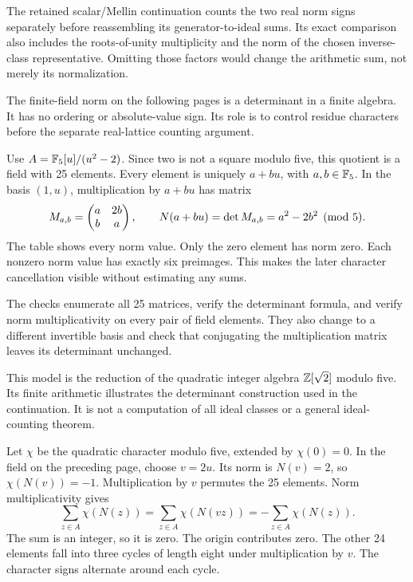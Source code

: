 The retained scalar/Mellin continuation counts the two real norm signs separately before reassembling its generator-to-ideal sums. Its exact comparison also includes the roots-of-unity multiplicity and the norm of the chosen inverse-class representative. Omitting those factors would change the arithmetic sum, not merely its normalization.

The finite-field norm on the following pages is a determinant in a finite algebra. It has no ordering or absolute-value sign. Its role is to control residue characters before the separate real-lattice counting argument.

Use $A=\mathbb F_5[u]/(u^2-2)$. Since two is not a square modulo five, this quotient is a field with 25 elements. Every element is uniquely $a+bu$, with $a,b\in\mathbb F_5$.
In the basis $(1,u)$, multiplication by $a+bu$ has matrix
\[
M_{a,b}=\begin{pmatrix}a&2b\\b&a\end{pmatrix},
\qquad N(a+bu)=\det M_{a,b}=a^2-2b^2\pmod5.
\]
The table shows every norm value. Only the zero element has norm zero. Each nonzero norm value has exactly six preimages. This makes the later character cancellation visible without estimating any sums.

The checks enumerate all 25 matrices, verify the determinant formula, and verify norm multiplicativity on every pair of field elements. They also change to a different invertible basis and check that conjugating the multiplication matrix leaves its determinant unchanged.

This model is the reduction of the quadratic integer algebra $\mathbb Z[\sqrt2]$ modulo five. Its finite arithmetic illustrates the determinant construction used in the continuation. It is not a computation of all ideal classes or a general ideal-counting theorem.

Let $\chi$ be the quadratic character modulo five, extended by $\chi(0)=0$. In the field on the preceding page, choose $v=2u$. Its norm is $N(v)=2$, so $\chi(N(v))=-1$.
Multiplication by $v$ permutes the 25 elements. Norm multiplicativity gives
\[
\sum_{z\in A}\chi(N(z))
=\sum_{z\in A}\chi(N(vz))
=-\sum_{z\in A}\chi(N(z)).
\]
The sum is an integer, so it is zero. The origin contributes zero. The other 24 elements fall into three cycles of length eight under multiplication by $v$. The character signs alternate around each cycle.

